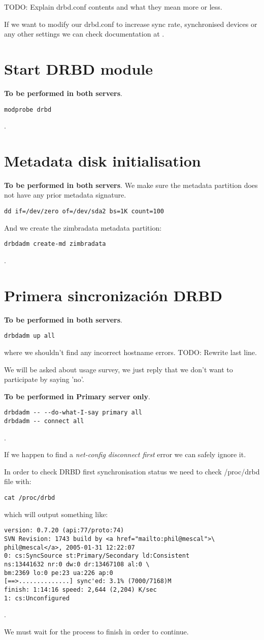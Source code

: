 TODO: Explain drbd.conf contents and what they mean more or less.

If we want to modify our drbd.conf to increase sync rate, synchronised devices or any other settings we can check documentation at \cite{LinbitDRBDdrbdconf}.

\section {Start DRBD module}
\textbf{To be performed in both servers}.
\begin{verbatim}
modprobe drbd
\end{verbatim}
.
\section {Metadata disk initialisation}
\textbf{To be performed in both servers}.
We make sure the metadata partition does not have any prior metadata signature.
\begin{verbatim}
dd if=/dev/zero of=/dev/sda2 bs=1K count=100
\end{verbatim}
And we create the zimbradata metadata partition:
\begin{verbatim}
drbdadm create-md zimbradata
\end{verbatim}
.

\section {Primera sincronizaci\'on DRBD}
\textbf{To be performed in both servers}.
\begin{verbatim}
drbdadm up all
\end{verbatim}
where we shouldn't find any incorrect hostname errors.
TODO: Rewrite last line.

We will be asked about usage survey, we just reply that we don't want to participate by saying 'no'.

\textbf{To be performed in Primary server only}.
\begin{verbatim}
drbdadm -- --do-what-I-say primary all
drbdadm -- connect all
\end{verbatim}
.

If we happen to find a \textit{net-config disconnect first} error we can safely ignore it.

In order to check DRBD first synchronisation status we need to check /proc/drbd file with:
\begin{verbatim}
cat /proc/drbd
\end{verbatim}
which will output something like:
\begin{verbatim}
version: 0.7.20 (api:77/proto:74)
SVN Revision: 1743 build by <a href="mailto:phil@mescal">\
phil@mescal</a>, 2005-01-31 12:22:07
0: cs:SyncSource st:Primary/Secondary ld:Consistent
ns:13441632 nr:0 dw:0 dr:13467108 al:0 \
bm:2369 lo:0 pe:23 ua:226 ap:0
[==>..............] sync'ed: 3.1% (7000/7168)M
finish: 1:14:16 speed: 2,644 (2,204) K/sec
1: cs:Unconfigured
\end{verbatim}
.

We must wait for the process to finish in order to continue.






